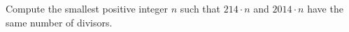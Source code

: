 Compute the smallest positive integer $n$ such that $214\cdot n$ and $2014\cdot n$ have the same number of divisors.